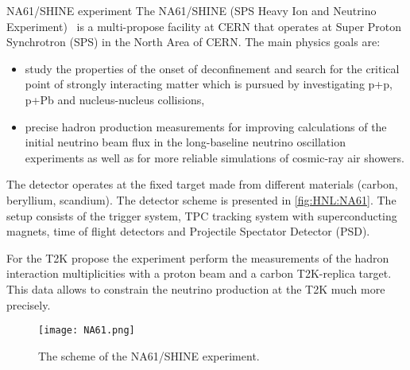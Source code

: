 \documentclass[../main.tex]{subfiles}
\begin{document}
\begin{bclogo}[couleur=blue!2, arrondi=0.1, logo=\bcinfo, nobreak=true]{NA61/SHINE experiment}
The NA61/SHINE (SPS Heavy Ion and Neutrino Experiment)~\cite{Abgrall2014} is a multi-propose facility at CERN that operates at Super Proton Synchrotron (SPS) in the North Area of CERN. The main physics goals are:
\begin{itemize}
    \item study the properties of the onset of deconfinement and search for the critical point of strongly interacting matter which is pursued by investigating p+p, p+Pb and nucleus-nucleus collisions,
    \item precise hadron production measurements for improving calculations of the initial neutrino beam flux in the long-baseline neutrino oscillation experiments as well as for more reliable simulations of cosmic-ray air showers.
\end{itemize}
The detector operates at the fixed target made from different materials (carbon, beryllium, scandium). The detector scheme is presented in \autoref{fig:HNL:NA61}. The setup consists of the trigger system, TPC tracking system with superconducting magnets, time of flight detectors and Projectile Spectator Detector (PSD).

For the T2K propose the experiment perform the measurements of the hadron interaction multiplicities with a proton beam and a carbon T2K-replica target. This data allows to constrain the neutrino production at the T2K much more precisely.
\end{bclogo}

\begin{figure}[!ht]
    \centering
    \texttt{[image: NA61.png]}
    \caption{The scheme of the NA61/SHINE experiment.}
    \label{fig:HNL:NA61}
\end{figure}
\end{document}
